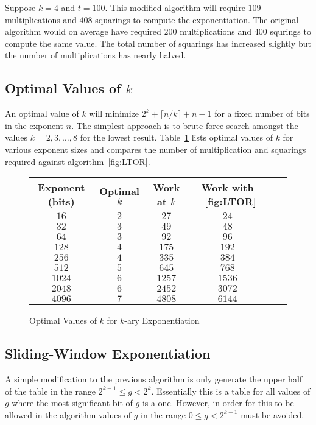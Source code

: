 \documentclass[b5paper]{book}
\begin{document}
Suppose $k = 4$ and $t = 100$.  This modified algorithm will require $109$ multiplications and $408$ squarings to compute the exponentiation.  The
original algorithm would on average have required $200$ multiplications and $400$ squrings to compute the same value.  The total number of squarings
has increased slightly but the number of multiplications has nearly halved.

\subsection{Optimal Values of $k$}
An optimal value of $k$ will minimize $2^{k} + \lceil n / k \rceil + n - 1$ for a fixed number of bits in the exponent $n$.  The simplest
approach is to brute force search amongst the values $k = 2, 3, \ldots, 8$ for the lowest result.  Table~\ref{fig:OPTK} lists optimal values of $k$
for various exponent sizes and compares the number of multiplication and squarings required against algorithm~\ref{fig:LTOR}.  

\begin{figure}[here]
\begin{center}
\begin{small}
\begin{tabular}{|c|c|c|c|c|c|}
\hline \textbf{Exponent (bits)} & \textbf{Optimal $k$} & \textbf{Work at $k$} & \textbf{Work with ~\ref{fig:LTOR}} \\
\hline $16$ & $2$ & $27$ & $24$ \\
\hline $32$ & $3$ & $49$ & $48$ \\
\hline $64$ & $3$ & $92$ & $96$ \\
\hline $128$ & $4$ & $175$ & $192$ \\
\hline $256$ & $4$ & $335$ & $384$ \\
\hline $512$ & $5$ & $645$ & $768$ \\
\hline $1024$ & $6$ & $1257$ & $1536$ \\
\hline $2048$ & $6$ & $2452$ & $3072$ \\
\hline $4096$ & $7$ & $4808$ & $6144$ \\
\hline
\end{tabular}
\end{small}
\end{center}
\caption{Optimal Values of $k$ for $k$-ary Exponentiation}
\label{fig:OPTK}
\end{figure}

\subsection{Sliding-Window Exponentiation}
A simple modification to the previous algorithm is only generate the upper half of the table in the range $2^{k-1} \le g < 2^k$.  Essentially
this is a table for all values of $g$ where the most significant bit of $g$ is a one.  However, in order for this to be allowed in the 
algorithm values of $g$ in the range $0 \le g < 2^{k-1}$ must be avoided.  
\end{document}
